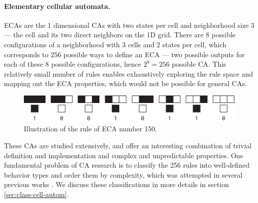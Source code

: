 \paragraph{Elementary cellular automata.\label{sec:elem-cell-autom}}
\Acp{ECA} are the 1 dimensional \acp{CA} with two states per cell and
neighborhood size 3 --- the cell and its two direct neighbors on the 1D grid.
There are 8 possible configurations of a neighborhood with 3 cells and 2 states
per cell, which corresponds to 256 possible ways to define an \ac{ECA} --- two
possible outputs for each of these 8 possible configurations, hence
$2^{8} = 256$ possible \ac{CA}. This relatively small number of rules enables
exhaustively exploring the rule space and mapping out the \ac{ECA} properties,
which would not be possible for general \acp{CA}.

\begin{figure}[htbp]
  \centering
  \includegraphics[width=.95\linewidth]{figures/eca_150_rule}
  \caption{Illustration of the rule of \ac{ECA} number 150.}
  \label{fig:eca_150_rule}
\end{figure}

These \acp{CA} are studied extensively, and offer an interesting combination of
trivial definition and implementation and complex and unpredictable properties.
One fundamental problem of \ac{CA} research is to classify the 256 rules into
well-defined behavior types and order them by complexity, which was attempted in
several previous works \parencite{wuenscheGlobalDynamicsCellular1992,
  gutowitzTransientsCyclesComplexity1991,
  wuenscheClassifyingCellularAutomata1999, wolframNewKindScience2002,
  zenilCompressionBasedInvestigationDynamical2010,
  hudcovaClassificationComplexSystems2020,
  hudcovaComputationalHierarchyElementary2021}. We discuss these classifications
in more details in section \ref{sec:class-cell-autom}.

